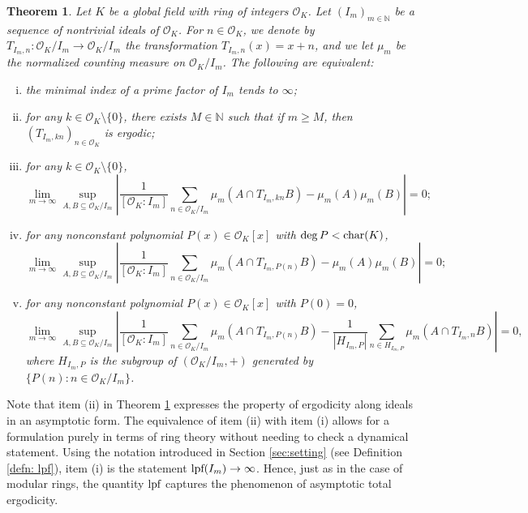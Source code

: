\documentclass{amsart}
\newtheorem{theorem}{Theorem}[section]
\theoremstyle{definition}
\numberwithin{equation}{section}
\newcommand{\N}{\mathbb{N}}
\newcommand{\mO}{\mathcal{O}}
\newcommand{\lpf}{\normalfont\text{lpf}}
\begin{document}
\begin{theorem} \label{thm: bb low characteristic}
    Let $K$ be a global field with ring of integers $\mO_K$.
    Let $(I_m)_{m \in \N}$ be a sequence of nontrivial ideals of $\mO_K$.
    For $n \in \mO_K$, we denote by $T_{I_m,n} : \mO_K/I_m \to \mO_K/I_m$ the transformation $T_{I_m,n}(x) = x + n$, and we let $\mu_m$ be the normalized counting measure on $\mO_K/I_m$.
    The following are equivalent:
    \begin{enumerate}[(i)]
        \item the minimal index of a prime factor of $I_m$ tends to $\infty$;
        \item for any $k \in \mO_K \setminus \{0\}$, there exists $M \in \N$ such that if $m \ge M$, then $(T_{I_m,kn})_{n \in \mO_K}$ is ergodic;
        \item for any $k \in \mO_K \setminus \{0\}$,
            \begin{equation*}
                \lim_{m \to \infty} \sup_{A, B \subseteq \mO_K/I_m} \left| \frac{1}{[\mO_K:I_m]} \sum_{n \in \mO_K/I_m} \mu_m(A \cap T_{I_m,kn}B) - \mu_m(A) \mu_m(B)\right| = 0;
            \end{equation*}
        \item for any nonconstant polynomial $P(x) \in \mO_K[x]$ with $\deg{P} < \textup{char}(K)$,
            \begin{equation*}
                \lim_{m \to \infty} \sup_{A, B \subseteq \mO_K/I_m} \left| \frac{1}{[\mO_K:I_m]} \sum_{n \in \mO_K/I_m} \mu_m(A \cap T_{I_m,P(n)}B) - \mu_m(A) \mu_m(B)\right| = 0;
            \end{equation*}
        \item for any nonconstant polynomial $P(x) \in \mO_K[x]$ with $P(0) = 0$,
            \begin{equation*}
                \lim_{m \to \infty} \sup_{A, B \subseteq \mO_K/I_m} \left| \frac{1}{[\mO_K:I_m]} \sum_{n \in \mO_K/I_m} \mu_m(A \cap T_{I_m,P(n)}B) - \frac{1}{|H_{I_m,P}|} \sum_{n \in H_{I_m,P}} \mu_m(A \cap T_{I_m,n}B) \right| = 0,
            \end{equation*}
            where $H_{I_m,P}$ is the subgroup of $(\mO_K/I_m,+)$ generated by $\{P(n) : n \in \mO_K/I_m\}$.
    \end{enumerate}
\end{theorem}

Note that item (ii) in Theorem \ref{thm: bb low characteristic} expresses the property of ergodicity along ideals in an asymptotic form.
The equivalence of item (ii) with item (i) allows for a formulation purely in terms of ring theory without needing to check a dynamical statement.
Using the notation introduced in Section \ref{sec:setting} (see Definition \ref{defn: lpf}), item (i) is the statement $\lpf(I_m) \to \infty$.
Hence, just as in the case of modular rings, the quantity $\lpf$ captures the phenomenon of asymptotic total ergodicity.
\end{document}
